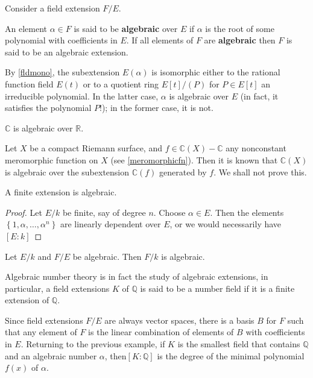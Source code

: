 Consider a field extension $F/E$.

\begin{definition}
An element $\alpha\in F$ is said to be \textbf{algebraic} over $E$ if
$\alpha$ is the root of some polynomial with coefficients in $E$. If all
elements of $F$ are \textbf{algebraic} then $F$ is said to be an algebraic extension. 
\end{definition}

By \cref{fldmono}, the subextension $E(\alpha)$ is isomorphic either to
the rational function field $E(t)$ or to a quotient ring $E[t]/(P)$ for $P
\in E[t]$ an irreducible polynomial. 
In the latter case, $\alpha$ is algebraic over $E$ (in fact, it
satisfies the polynomial $P$!); in the former case, it is not.

\begin{example} 
$\mathbb{C}$ is algebraic over $\mathbb{R}$.
\end{example} 

\begin{example} 
Let $X$ be a compact Riemann surface, and $f \in \mathbb{C}(X) - \mathbb{C}$ any
nonconstant meromorphic function on $X$ (see \cref{meromorphicfn}). Then it is known that
$\mathbb{C}(X)$ is algebraic over the subextension $\mathbb{C}(f)$ generated by
$f$. We shall not prove this.
\end{example} 


\begin{proposition} 
A finite extension is algebraic. 
\end{proposition} 
\begin{proof} 
Let $E/k$ be finite, say of degree $n$. Choose $\alpha \in E$.
Then the elements 
$\left\{1, \alpha, \dots, \alpha^n\right\}$ are linearly
dependent over $E$, or we would necessarily have $[E:k]$

\end{proof} 

\begin{proposition} 
Let $E/k$ and $F/E$ be algebraic. Then $F/k$ is algebraic.
\end{proposition} 


Algebraic number theory is in fact the study of algebraic extensions, in
particular, a field extensions $K$ of $\mathbb{Q}$ is said to be a number field
if it is a finite extension of $\mathbb{Q}$.

Since field extensions $F/E$ are always vector spaces, there is a basis $B$ for
$F$ such that any element of $F$ is the linear combination of elements of $B$
with coefficients in $E$. Returning to the previous example, if $K$ is the
smallest field that contains $\mathbb{Q}$ and an algebraic number $\alpha$,
then$[K:\mathbb{Q}]$ is the degree of the minimal polynomial $f(x)$ of $\alpha$.



